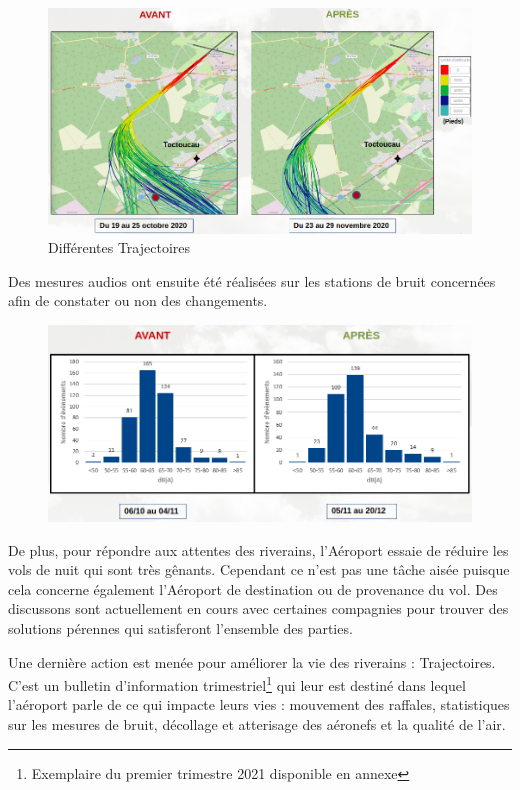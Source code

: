 \begin{figure}[hbt!]
  \centering
  \includegraphics[width=13.5cm]{Images/trajectoires_avant_apres.png}\newline
  \caption{Différentes Trajectoires}
  \label{fig:trajectoires}
\end{figure}

Des mesures audios ont ensuite été réalisées sur les stations de bruit concernées afin de constater ou non des changements.

\begin{figure}[hbt!]
  \centering
  \includegraphics[width=14cm]{Images/bruit_avant_apres.png}\newline
  \label{fig:Mesures audios}
\end{figure}

De plus, pour répondre aux attentes des riverains, l'Aéroport essaie de réduire les vols de nuit qui sont très gênants. Cependant ce n'est pas une tâche aisée puisque cela concerne également l'Aéroport de destination ou de provenance du vol. Des discussons sont actuellement en cours avec certaines compagnies pour trouver des solutions pérennes qui satisferont l'ensemble des parties.\newline


Une dernière action est menée pour améliorer la vie des riverains : Trajectoires. C'est un bulletin d'information trimestriel\footnote{Exemplaire du premier trimestre 2021 disponible en annexe} qui leur est destiné dans lequel l'aéroport parle de ce qui impacte leurs vies : mouvement des raffales, statistiques sur les mesures de bruit, décollage et atterisage des aéronefs et la qualité de l'air.


